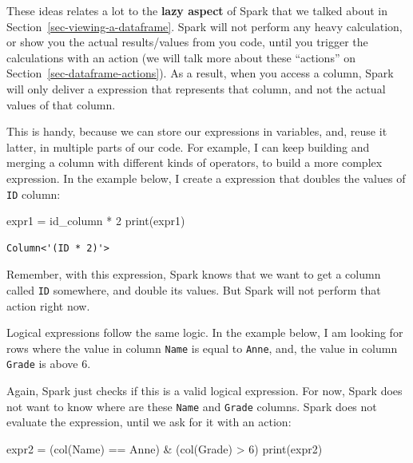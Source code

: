 \documentclass[
  11pt,
  letterpaper,
  DIV=11,
  numbers=noendperiod]{scrreprt}
\newenvironment{Shaded}{\begin{snugshade}}{\end{snugshade}}
\newcommand{\BuiltInTok}[1]{\textcolor[rgb]{0.00,0.23,0.31}{#1}}
\newcommand{\DecValTok}[1]{\textcolor[rgb]{0.68,0.00,0.00}{#1}}
\newcommand{\NormalTok}[1]{\textcolor[rgb]{0.00,0.23,0.31}{#1}}
\newcommand{\OperatorTok}[1]{\textcolor[rgb]{0.37,0.37,0.37}{#1}}
\newcommand{\StringTok}[1]{\textcolor[rgb]{0.13,0.47,0.30}{#1}}
\begin{document}
These ideas relates a lot to the \textbf{lazy aspect} of Spark that we
talked about in Section~\ref{sec-viewing-a-dataframe}. Spark will not
perform any heavy calculation, or show you the actual results/values
from you code, until you trigger the calculations with an action (we
will talk more about these ``actions'' on
Section~\ref{sec-dataframe-actions}). As a result, when you access a
column, Spark will only deliver a expression that represents that
column, and not the actual values of that column.

This is handy, because we can store our expressions in variables, and,
reuse it latter, in multiple parts of our code. For example, I can keep
building and merging a column with different kinds of operators, to
build a more complex expression. In the example below, I create a
expression that doubles the values of \texttt{ID} column:

\begin{Shaded}
\begin{Highlighting}[]
\NormalTok{expr1 }\OperatorTok{=}\NormalTok{ id\_column }\OperatorTok{*} \DecValTok{2}
\BuiltInTok{print}\NormalTok{(expr1)}
\end{Highlighting}
\end{Shaded}

\begin{verbatim}
Column<'(ID * 2)'>
\end{verbatim}

Remember, with this expression, Spark knows that we want to get a column
called \texttt{ID} somewhere, and double its values. But Spark will not
perform that action right now.

Logical expressions follow the same logic. In the example below, I am
looking for rows where the value in column \texttt{Name} is equal to
\texttt{\textquotesingle{}Anne\textquotesingle{}}, and, the value in
column \texttt{Grade} is above 6.

Again, Spark just checks if this is a valid logical expression. For now,
Spark does not want to know where are these \texttt{Name} and
\texttt{Grade} columns. Spark does not evaluate the expression, until we
ask for it with an action:

\begin{Shaded}
\begin{Highlighting}[]
\NormalTok{expr2 }\OperatorTok{=}\NormalTok{ (col(}\StringTok{\textquotesingle{}Name\textquotesingle{}}\NormalTok{) }\OperatorTok{==} \StringTok{\textquotesingle{}Anne\textquotesingle{}}\NormalTok{) }\OperatorTok{\&}\NormalTok{ (col(}\StringTok{\textquotesingle{}Grade\textquotesingle{}}\NormalTok{) }\OperatorTok{\textgreater{}} \DecValTok{6}\NormalTok{)}
\BuiltInTok{print}\NormalTok{(expr2)}
\end{Highlighting}
\end{Shaded}
\end{document}
